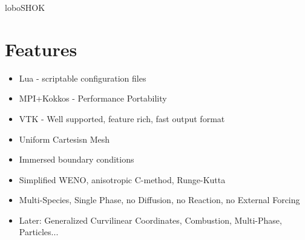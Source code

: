 \documentclass[10pt,letterpaper]{article}
\begin{document}
  loboSHOK
  \section*{Features}
  \begin{itemize}
    \item Lua - scriptable configuration files
    \item MPI+Kokkos - Performance Portability
    \item VTK - Well supported, feature rich, fast output format
    \item Uniform Cartesisn Mesh
    \item Immersed boundary conditions
    \item Simplified WENO, anisotropic C-method, Runge-Kutta
    \item Multi-Species, Single Phase, no Diffusion, no Reaction, no External Forcing
    \item Later: Generalized Curvilinear Coordinates, Combustion, Multi-Phase, Particles...
  \end{itemize}
\end{document}
